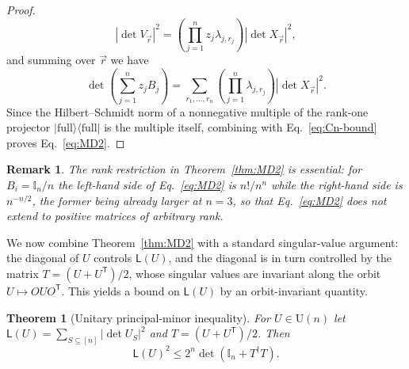 \documentclass[aps,prl,twocolumn,superscriptaddress,reprint,longbibliography,nofootinbib]{revtex4-2}
\newtheorem{theorem}{Theorem}
\newtheorem{remark}{Remark}
\newcommand{\trans}{\mathsf{T}}
\begin{document}
\begin{proof}
\begin{equation}
    |\det V_{\vec r}|^2
=
\left(\prod_{j=1}^n z_j\lambda_{j,r_j}\right)
|\det X_{\vec r}|^2,
\end{equation}
and summing over $\vec{r}$ we have
\begin{equation}
    [z_1\cdots z_n]\det\!\left(\sum_{j=1}^n z_jB_j\right)
=
\sum_{r_1,\ldots,r_n}
\left(\prod_{j=1}^n\lambda_{j,r_j}\right)
|\det X_{\vec r}|^2.
\end{equation}
Since the Hilbert--Schmidt norm of a nonnegative multiple of the rank-one projector $|\mathrm{full}\rangle\langle\mathrm{full}|$ is the multiple itself, combining with Eq.~\eqref{eq:Cn-bound} proves Eq.~\eqref{eq:MD2}. \end{proof}

\begin{remark}
The rank restriction in Theorem~\ref{thm:MD2} is essential: for $B_i=\mathbb{I}_n/n$ the left-hand side of Eq.~\eqref{eq:MD2} is $n!/n^n$ while the right-hand side is $n^{-n/2}$, the former being already larger at $n=3$, so that Eq.~\eqref{eq:MD2} does not extend to positive matrices of arbitrary rank.\end{remark}

We now combine Theorem~\ref{thm:MD2} with a standard singular-value argument: the diagonal of $U$ controls $\mathsf{L}(U)$, and the diagonal is in turn controlled by the matrix $T=(U+U^{\trans})/2$, whose singular values are invariant along the orbit $U\mapsto OUO^{\trans}$. This yields a bound on $\mathsf{L}(U)$ by an orbit-invariant quantity.

\begin{theorem}[Unitary principal-minor inequality]
\label{thm:UL}
For $U\in \mathrm{U}(n)$ let $\mathsf{L}(U)=\sum_{S\subseteq[n]}|\det U_S|^2$ and $T=(U+U^{\trans})/2$. Then
\begin{equation}
    \mathsf{L}(U)^2\le 2^n\det\!\left(\mathbb{I}_n+T^\dagger T\right).
    \label{eq:UL}
\end{equation}
\end{theorem}
\end{document}

